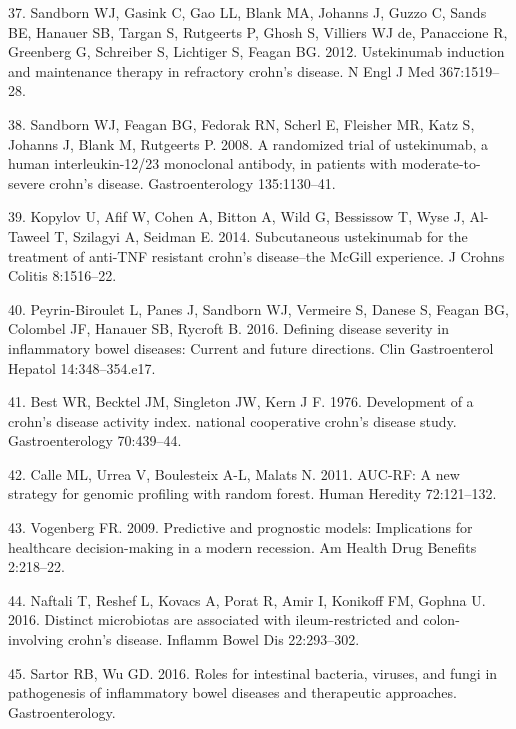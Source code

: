 \documentclass[12pt,]{article}
\begin{document}
\hypertarget{ref-sandborn_ust_2012}{}
37. Sandborn WJ, Gasink C, Gao LL, Blank MA, Johanns J, Guzzo C, Sands
BE, Hanauer SB, Targan S, Rutgeerts P, Ghosh S, Villiers WJ de,
Panaccione R, Greenberg G, Schreiber S, Lichtiger S, Feagan BG. 2012.
Ustekinumab induction and maintenance therapy in refractory crohn's
disease. N Engl J Med 367:1519--28.

\hypertarget{ref-sandborn_ust_2008}{}
38. Sandborn WJ, Feagan BG, Fedorak RN, Scherl E, Fleisher MR, Katz S,
Johanns J, Blank M, Rutgeerts P. 2008. A randomized trial of
ustekinumab, a human interleukin-12/23 monoclonal antibody, in patients
with moderate-to-severe crohn's disease. Gastroenterology 135:1130--41.

\hypertarget{ref-kopylov_ust_2014}{}
39. Kopylov U, Afif W, Cohen A, Bitton A, Wild G, Bessissow T, Wyse J,
Al-Taweel T, Szilagyi A, Seidman E. 2014. Subcutaneous ustekinumab for
the treatment of anti-TNF resistant crohn's disease--the McGill
experience. J Crohns Colitis 8:1516--22.

\hypertarget{ref-PB_CDAI_2016}{}
40. Peyrin-Biroulet L, Panes J, Sandborn WJ, Vermeire S, Danese S,
Feagan BG, Colombel JF, Hanauer SB, Rycroft B. 2016. Defining disease
severity in inflammatory bowel diseases: Current and future directions.
Clin Gastroenterol Hepatol 14:348--354.e17.

\hypertarget{ref-Best_CDAI_1976}{}
41. Best WR, Becktel JM, Singleton JW, Kern J F. 1976. Development of a
crohn's disease activity index. national cooperative crohn's disease
study. Gastroenterology 70:439--44.

\hypertarget{ref-calle_aucrf_2011}{}
42. Calle ML, Urrea V, Boulesteix A-L, Malats N. 2011. AUC-RF: A new
strategy for genomic profiling with random forest. Human Heredity
72:121--132.

\hypertarget{ref-Vogenberg_progmods_2009}{}
43. Vogenberg FR. 2009. Predictive and prognostic models: Implications
for healthcare decision-making in a modern recession. Am Health Drug
Benefits 2:218--22.

\hypertarget{ref-naftali_tissinvol_2016}{}
44. Naftali T, Reshef L, Kovacs A, Porat R, Amir I, Konikoff FM, Gophna
U. 2016. Distinct microbiotas are associated with ileum-restricted and
colon-involving crohn's disease. Inflamm Bowel Dis 22:293--302.

\hypertarget{ref-sartor_microbesIBD_2016}{}
45. Sartor RB, Wu GD. 2016. Roles for intestinal bacteria, viruses, and
fungi in pathogenesis of inflammatory bowel diseases and therapeutic
approaches. Gastroenterology.
\end{document}
